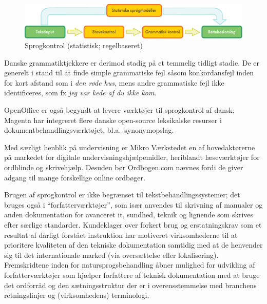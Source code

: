 \begin{multicols}{2}
\begin{figure}[htb]
  \center
  \includegraphics[width=\textwidth]{../_media/danish/language_checking}
  \caption{Sprogkontrol (statistisk; regelbaseret)}
  \label{fig:langcheckingaarch_de}
\end{figure}

Danske grammatiktjekkere er derimod stadig \mbox{p\aa} et temmelig tidligt stadie. De er generelt i stand til at finde simple grammatiske fejl s\aa som konkordansfejl inden for kort afstand som i {\it *den r\o de hus}, mens andre grammatiske fejl ikke identificeres, som fx {\it *jeg var kede af du ikke kom}.

OpenOffice er \mbox{ogs\aa} begyndt at levere v\ae rkt\o jer til sprogkontrol af dansk; Magenta  har integreret flere danske open-source leksikalske resurser i dokumentbehandlingsv\ae rkt\o jet, bl.a.\ synonymopslag.

Med s\ae rligt henblik \mbox{p\aa} undervisning er Mikro V\ae rkstedet en af hovedakt\o rerne \mbox{p\aa} markedet for digitale undervisningshj\ae lpemidler, heriblandt l\ae sev\ae rkt\o jer for ordblinde og skrivehj\ae lp. Desuden b\o r Ordbogen.com n\ae vnes fordi de giver adgang til mange forskellige online ordb\o ger. 

Brugen af sprogkontrol er ikke begr\ae nset til tekstbehandlingssystemer; det bruges \mbox{ogs\aa} i ``forfatterv\ae rkt\o jer'', som is\ae r anvendes til skrivning af manualer og anden dokumentation for avanceret it, sundhed, teknik og lignende som skrives efter s\ae rlige standarder. Kundeklager over forkert brug og erstatningskrav som et resultat af d\aa rligt forst\aa et instruktion har motiveret virksomhederne til at prioritere kvaliteten af den tekniske dokumentation samtidig med at de henvender sig til det internationale marked (via overs\ae ttelse eller lokalisering). Fremskridtene inden for natursprogsbehandling \aa bner mulighed for udvikling af forfatterv\ae rkt\o jer som hj\ae lper forfattere af teknisk dokumentation med at bruge det ordforr\aa d og den s\ae tningsstruktur der er i overensstemmelse med branchens retningslinjer og (virksomhedens) terminologi.



\end{multicols}
